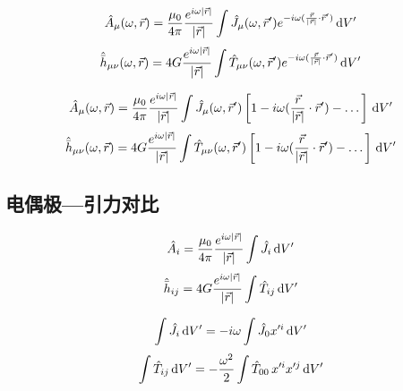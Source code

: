 \begin{equation}
    \hat{A}_{\mu}(\omega,\vec{r})=\frac{\mu_0}{4\pi}\frac{e^{i\omega\left\lvert\vec{r}\right\rvert}}{\left\lvert\vec{r}\right\rvert}\int\hat{J}_{\mu}(\omega,\vec{r}')e^{-i\omega(\frac{\vec{r}}{\left\lvert\vec{r}\right\rvert}\cdot\vec{r}')}\,\mathrm{d} V'
\end{equation}
\begin{equation}
    \hat{\bar{h}}_{\mu\nu}(\omega,\vec{r})=4G\frac{e^{i\omega\left\lvert\vec{r}\right\rvert}}{\left\lvert\vec{r}\right\rvert}\int\hat{T}_{\mu\nu}(\omega,\vec{r}')e^{-i\omega(\frac{\vec{r}}{\left\lvert\vec{r}\right\rvert}\cdot\vec{r}')}\,\mathrm{d} V'
\end{equation}

\begin{equation}
    \hat{A}_{\mu}(\omega,\vec{r})=\frac{\mu_0}{4\pi}\frac{e^{i\omega\left\lvert\vec{r}\right\rvert}}{\left\lvert\vec{r}\right\rvert}\int\hat{J}_{\mu}(\omega,\vec{r}')\left[1-i\omega(\frac{\vec{r}}{\left\lvert\vec{r}\right\rvert}\cdot\vec{r}')-\dots\right]\,\mathrm{d} V'
\end{equation}
\begin{equation}
    \hat{\bar{h}}_{\mu\nu}(\omega,\vec{r})=4G\frac{e^{i\omega\left\lvert\vec{r}\right\rvert}}{\left\lvert\vec{r}\right\rvert}\int\hat{T}_{\mu\nu}(\omega,\vec{r}')\left[1-i\omega(\frac{\vec{r}}{\left\lvert\vec{r}\right\rvert}\cdot\vec{r}')-\dots\right]\,\mathrm{d} V'
\end{equation}

\subsection{电偶极---引力对比}

\begin{equation}
    \hat{A}_i=\frac{\mu_0}{4\pi}\frac{e^{i\omega\left\lvert\vec{r}\right\rvert}}{\left\lvert\vec{r}\right\rvert}\int\hat{J}_i\,\mathrm{d} V'
\end{equation}
\begin{equation}
    \hat{\bar{h}}_{ij}=4G\frac{e^{i\omega\left\lvert\vec{r}\right\rvert}}{\left\lvert\vec{r}\right\rvert}\int\hat{T}_{ij}\,\mathrm{d} V'
\end{equation}

\begin{equation}
    \int \hat{J}_{i}\,\mathrm{d} V'=-i\omega\int\hat{J}_{0}x'^i\,\mathrm{d} V'
\end{equation}
\begin{equation}
    \int\hat{T}_{ij}\,\mathrm{d} V'=-\frac{\omega^2}{2}\int \hat{T}_{00}\,x'^ix'^j\,\mathrm{d} V'
\end{equation}

